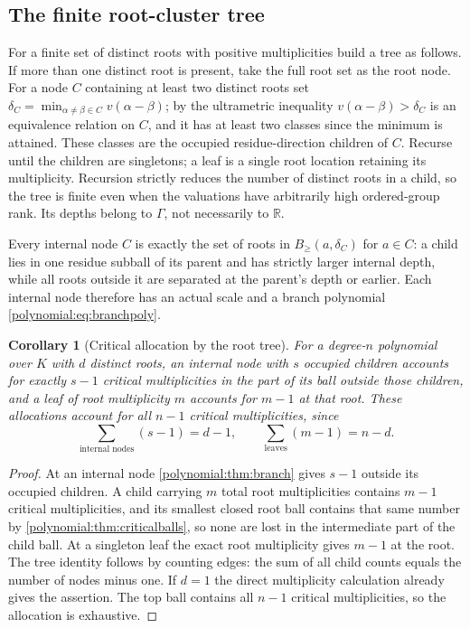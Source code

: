 \documentclass[11pt,letterpaper]{article}
\numberwithin{equation}{section}
\newtheorem{corollary}[theorem]{Corollary}
\theoremstyle{definition}
\theoremstyle{remark}\newtheorem{remark}[theorem]{Remark}
\newcommand{\R}{\mathbb R}
\newcommand{\Bge}[2]{B_{\ge}(#1,#2)}
\begin{document}
\subsection{The finite root-cluster tree}\label{polynomial:subsec:tree}
For a finite set of distinct roots with positive multiplicities build a tree
as follows. If more than one distinct root is present, take the full root set
as the root node. For a node $C$ containing at least two distinct roots set
$\delta_C=\min_{\alpha\ne\beta\in C}v(\alpha-\beta)$; by the ultrametric
inequality $v(\alpha-\beta)>\delta_C$ is an equivalence relation on $C$, and it
has at least two classes since the minimum is attained. These classes are the
occupied residue-direction children of $C$. Recurse until the children are
singletons; a leaf is a single root location retaining its multiplicity.
Recursion strictly reduces the number of distinct roots in a child, so the
tree is finite even when the valuations have arbitrarily high ordered-group
rank. Its depths belong to $\Gamma$, not necessarily to $\R$.

Every internal node $C$ is exactly the set of roots in $\Bge a{\delta_C}$ for
$a\in C$: a child lies in one residue subball of its parent and has strictly
larger internal depth, while all roots outside it are separated at the
parent's depth or earlier. Each internal node therefore has an actual scale
and a branch polynomial \eqref{polynomial:eq:branchpoly}.

\begin{corollary}[Critical allocation by the root tree]\label{polynomial:cor:tree}
For a degree-$n$ polynomial over $K$ with $d$ distinct roots, an internal node
with $s$ occupied children accounts for exactly $s-1$ critical multiplicities
in the part of its ball outside those children, and a leaf of root
multiplicity $m$ accounts for $m-1$ at that root. These allocations account
for all $n-1$ critical multiplicities, since
\[
 \sum_{\text{internal nodes}}(s-1)=d-1,\qquad
 \sum_{\text{leaves}}(m-1)=n-d .
\]
\end{corollary}
\begin{proof}
At an internal node \cref{polynomial:thm:branch} gives $s-1$ outside its
occupied children. A child carrying $m$ total root multiplicities contains
$m-1$ critical multiplicities, and its smallest closed root ball contains that
same number by \cref{polynomial:thm:criticalballs}, so none are lost in the
intermediate part of the child ball. At a singleton leaf the exact root
multiplicity gives $m-1$ at the root. The tree identity follows by counting
edges: the sum of all child counts equals the number of nodes minus one. If
$d=1$ the direct multiplicity calculation already gives the assertion. The top
ball contains all $n-1$ critical multiplicities, so the allocation is
exhaustive.
\end{proof}
\end{document}
